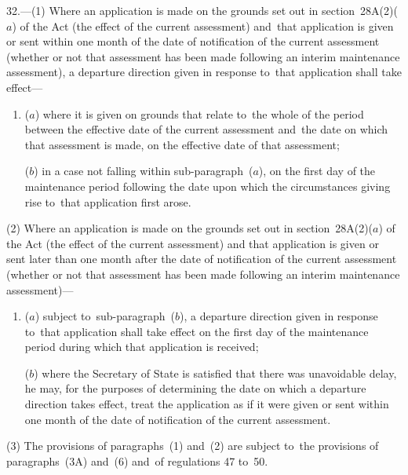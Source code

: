 \documentclass[12pt,a4paper]{article}
\begin{document}
32.—(1) Where an application is made on the grounds set out in section~28A(2)($a$) of the Act (the effect of the current assessment) and~that application is given or sent within 
one month  %
of the date of notification of the current assessment (whether or not that assessment has been made following an interim maintenance assessment), a departure direction given in response to~that application shall take effect—
\begin{enumerate}\item[]
($a$) where it is given on grounds that relate to~the whole of the period between the effective date of the current assessment and~the date on which that assessment is made, on the effective date of that assessment;

($b$) in a case not falling within sub-paragraph~($a$), on the first day of the maintenance period following the date upon which the circumstances giving rise to~that application first arose.
\end{enumerate}

(2) Where an application is made on the grounds set out in section~28A(2)($a$) of the Act (the effect of the current assessment) and that application is given or sent later than 
one month  %
after the date of notification of the current assessment (whether or not that assessment has been made following an interim maintenance assessment)—
\begin{enumerate}\item[]
($a$) subject to~sub-paragraph~($b$), a departure direction given in response to~that application shall take effect on the first day of the maintenance period during which that application is received;

($b$) where the Secretary of State is satisfied that there was unavoidable delay, he may, for the purposes of determining the date on which a departure direction takes effect, treat the application as if it were given or sent within 
one month  %
of the date of notification of the current assessment.
\end{enumerate}

(3) The provisions of paragraphs~(1) and~(2) are subject to~the provisions of 
paragraphs~(3A) and~(6)  %
and~of regulations 47 to~50.
\end{document}
